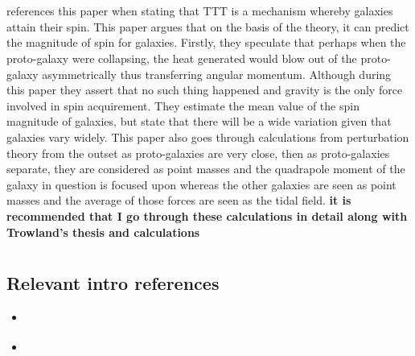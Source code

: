 \documentclass[fleqn,usenatbib]{mnras}
\begin{document}
\section{\citet{Peebles_69}}
\citet{Trowland_13} references this paper when stating that TTT is a mechanism whereby galaxies attain their spin.
This paper argues that on the basis of the theory, it can predict the magnitude of spin for galaxies.
Firstly, they speculate that perhaps when the proto-galaxy were collapsing, the heat generated would blow out of the proto-galaxy asymmetrically thus transferring angular momentum. Although during this paper they assert that no such thing happened and gravity is the only force involved in spin acquirement. 
They estimate the mean value of the spin magnitude of galaxies, but state that there will be a wide variation given that galaxies vary widely. 
This paper also goes through calculations from perturbation theory from the outset as proto-galaxies are very close, then as proto-galaxies separate, they are considered as point masses and the quadrapole moment of the galaxy in question is focused upon whereas the other galaxies are seen as point masses and the average of those forces are seen as the tidal field. \textbf{it is recommended that I go through these calculations in detail along with Trowland's thesis and \citet{Shafer_09} calculations} 

\section{\citet{Vitvitska02}}
\subsection{Relevant intro references}
\begin{itemize}
\item \citet{Sugerman_00}
\item \citet{Porciani_02}
\end{itemize}
\end{document}
